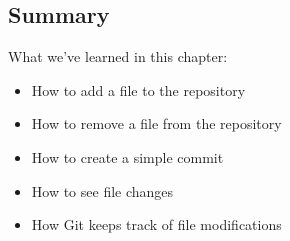 \subsection{Summary}
\begin{frame}[fragile]
\subslidetitle
  What we've learned in this chapter:
  \begin{itemize}
    \item How to add a file to the repository
    \item How to remove a file from the repository
    \item How to create a simple commit
    \item How to see file changes
    \item How Git keeps track of file modifications
  \end{itemize}
\end{frame}
